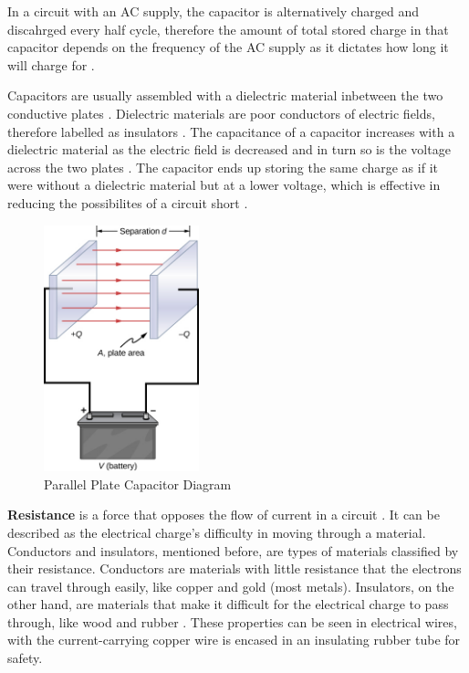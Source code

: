 \documentclass[12pt]{article}
\begin{document}
In a circuit with an AC supply, the capacitor is alternatively charged and discahrged every half cycle, therefore the amount of total
stored charge in that capacitor depends on the frequency of the AC supply as it dictates how long it will charge for
\cite{britcapacitance}.

Capacitors are usually assembled with a dielectric material inbetween the two conductive plates
\cite{britcapacitance,flukecapacitance,librecapacitance}.
Dielectric materials are poor conductors of electric fields, therefore labelled as insulators 
\cite{britdielectric}.
The capacitance of a capacitor increases with a dielectric material as the electric field is decreased and in turn so is the voltage across the two plates
\cite{hyperdielectric}.
The capacitor ends up storing the same charge as if it were without a dielectric material but at a lower voltage, which is effective in reducing the possibilites of a circuit short
\cite{hyperdielectric}.

\begin{figure}[H]
    \centering
    \includegraphics[width=4.5cm]{parallel plate capacitor.jpg}
    \caption{\centering \footnotesize{Parallel Plate Capacitor Diagram \protect\cite{librecapacitance}}}
    \label{fig:ppcapacitor}
\end{figure}

\textbf{Resistance} is a force that opposes the flow of current in a circuit
\cite{flukeresistance,hiokiresistance,britresistance}.
It can be described as the electrical charge's difficulty in moving through a material.
\cite{hiokiresistance}
Conductors and insulators, mentioned before, are types of materials classified by their resistance. Conductors are materials with little resistance that the
electrons can travel through easily, like copper and gold (most metals). Insulators, on the other hand, are materials that make it difficult for the electrical
charge to pass through, like wood and rubber
\cite{flukeresistance}.
These properties can be seen in electrical wires, with the current-carrying copper wire is encased in an insulating rubber tube for safety.
\end{document}
